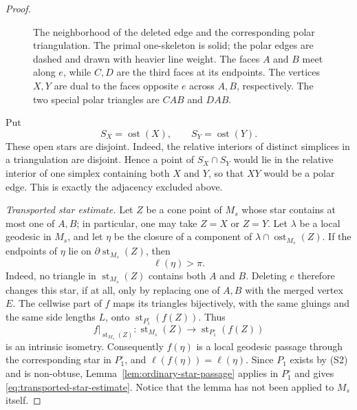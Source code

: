 \documentclass[12pt,a4paper]{article}
\theoremstyle{definition}
\begin{document}
\begin{proof}
\begin{figure}[H]
{%
}
\caption{The neighborhood of the deleted edge and the corresponding polar
triangulation. The primal one-skeleton is solid; the polar edges are dashed
and drawn with heavier line weight. The faces \(A\) and \(B\) meet along \(e\), while
\(C,D\) are the third faces at its endpoints. The vertices \(X,Y\) are dual
to the faces opposite \(e\) across \(A,B\), respectively. The two special
polar triangles are \(CAB\) and \(DAB\).}
\label{fig:edge-polar-neighborhood}
\end{figure}

Put
\[
        S_X=\operatorname{ost}(X),\qquad
        S_Y=\operatorname{ost}(Y).
\]
These open stars are disjoint.  Indeed, the relative interiors of distinct
simplices in a triangulation are disjoint.  Hence a point of
\(S_X\cap S_Y\) would lie in the relative interior of one simplex containing
both \(X\) and \(Y\), so that \(XY\) would be a polar edge.  This is exactly
the adjacency excluded above.

\emph{Transported star estimate.}
Let \(Z\) be a cone point of \(M_s\) whose star contains at most one of
\(A,B\); in particular, one may take \(Z=X\) or \(Z=Y\). Let \(\lambda\) be a
local geodesic in \(M_s\), and let
\(\eta\) be the closure of a component of
\(\lambda\cap\operatorname{ost}_{M_s}(Z)\).  If the endpoints of \(\eta\)
lie on \(\partial\operatorname{st}_{M_s}(Z)\), then
\begin{equation}\label{eq:transported-star-estimate}
        \ell(\eta)>\pi .
\end{equation}
Indeed, no triangle in \(\operatorname{st}_{M_s}(Z)\) contains both \(A\)
and \(B\). Deleting \(e\) therefore changes this star, if at all, only by
replacing one of \(A,B\) with the merged vertex \(E\). The cellwise part of \(f\)
maps its triangles bijectively, with the same gluings and the same side lengths
\(L\), onto \(\operatorname{st}_{P_1^\circ}(f(Z))\).  Thus
\[
 f|_{\operatorname{st}_{M_s}(Z)}\colon
 \operatorname{st}_{M_s}(Z)\longrightarrow
 \operatorname{st}_{P_1^\circ}(f(Z))
\]
is an intrinsic isometry. Consequently \(f(\eta)\) is a local geodesic
passage through the corresponding star in \(P_1^\circ\), and
\(\ell(f(\eta))=\ell(\eta)\).  Since \(P_1\) exists by \textup{(S2)} and is
non-obtuse, Lemma~\ref{lem:ordinary-star-passage} applies in
\(P_1^\circ\) and gives \eqref{eq:transported-star-estimate}.  Notice that
the lemma has not been applied to \(M_s\) itself.


\end{proof}
\end{document}
